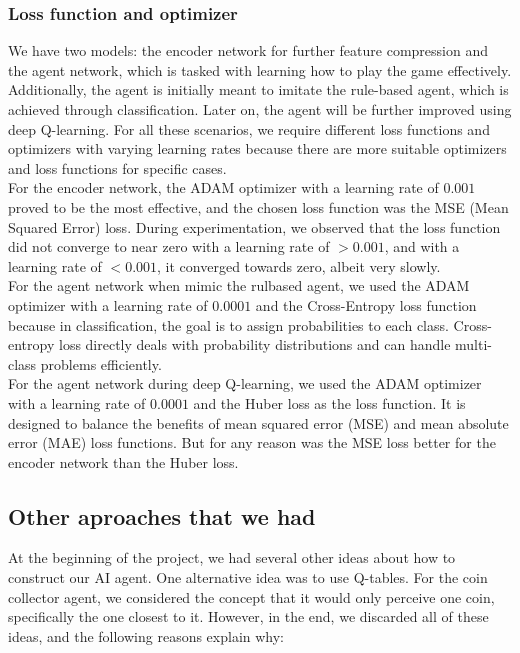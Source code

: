 \subsubsection*{Loss function and optimizer}

We have two models: the encoder network for further feature compression and the agent network, which is tasked with 
learning how to play the game effectively. Additionally, the agent is initially meant to imitate the rule-based agent, which is 
achieved through classification. Later on, the agent will be further improved using deep Q-learning. For all these scenarios, we require 
different loss functions and optimizers with varying learning rates because there are more suitable optimizers and loss functions for specific cases.\\

For the encoder network, the ADAM optimizer with a learning rate of $0.001$ proved to be the most effective, and the chosen loss 
function was the MSE (Mean Squared Error) loss. During experimentation, we observed that the loss function did not converge to near 
zero with a learning rate of $>0.001$, and with a learning rate of $<0.001$, it converged towards zero, albeit very slowly. \\

For the agent network when mimic the rulbased agent, we used the ADAM optimizer with a learning rate of $0.0001$ and the Cross-Entropy loss function because
in classification, the goal is to assign probabilities to each class. Cross-entropy loss directly deals with probability 
distributions and can handle multi-class problems efficiently.\\

For the agent network during deep Q-learning, we used the ADAM optimizer with a learning rate of $0.0001$ and the Huber loss as the loss function.
It is designed to balance the benefits of mean squared error (MSE) and mean absolute error (MAE) loss functions.
But for any reason was the MSE loss better for the encoder network than the Huber loss.

\subsection{Other aproaches that we had}

At the beginning of the project, we had several other ideas about how to construct our AI agent. One alternative idea was to use Q-tables. 
For the coin collector agent, we considered the concept that it would only perceive one coin, specifically the one closest to it.
However, in the end, we discarded all of these ideas, and the following reasons explain why:


